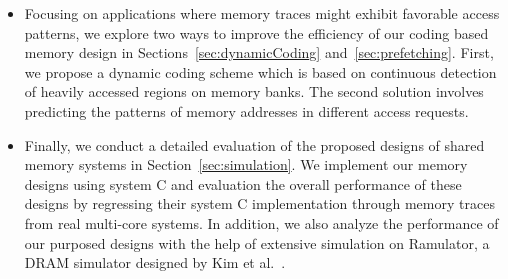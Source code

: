 \begin{itemize}
\item Focusing on applications where memory traces might exhibit favorable access patterns, we explore two ways to improve the efficiency of our coding based memory design in Sections~\ref{sec:dynamicCoding} and~\ref{sec:prefetching}. First, we propose a dynamic coding scheme which is based on continuous detection of heavily accessed regions on memory banks. 
The second solution involves predicting the patterns of memory addresses in different access requests. 
\item {\color{blue}Finally, we conduct a detailed evaluation of the proposed designs of shared memory systems in Section~\ref{sec:simulation}. We implement our memory designs using system C and evaluation the overall performance of these designs by regressing their system C implementation through memory traces from real multi-core systems. In addition, we also analyze the performance of our purposed designs with the help of extensive simulation on Ramulator, a DRAM simulator designed by Kim et al.~\cite{Ramulator}.} %
\end{itemize}

